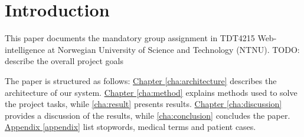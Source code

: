 \chapter{Introduction}
This paper documents the mandatory group assignment in TDT4215 Web-intelligence
at Norwegian University of Science and Technology (NTNU).
TODO: describe the overall project goals

The paper is structured as follows:
\hyperref[cha:architecture]{Chapter \ref*{cha:architecture}} describes the
architecture of our system.
\hyperref[cha:method]{Chapter \ref*{cha:method}} explains methods used to
solve the project tasks, while \autoref{cha:result} presents results.
\hyperref[cha:discussion]{Chapter \ref*{cha:discussion}} provides a discussion
of the results, while \autoref{cha:conclusion} concludes the paper.
\hyperref[appendix]{Appendix \ref*{appendix}} list stopwords, medical terms
and patient cases.
